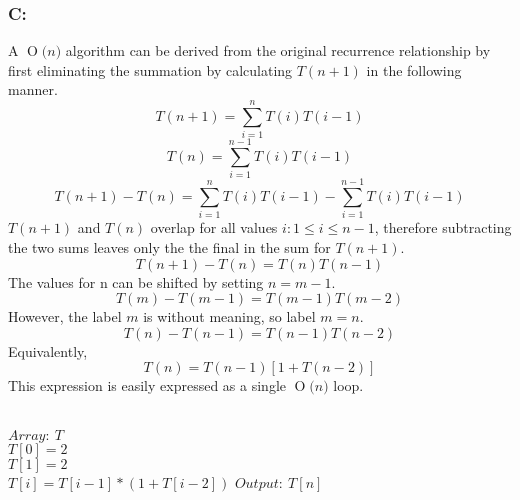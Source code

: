 \documentclass[12pt]{article}
\newcommand{\BigO}[1]{\ensuremath{\operatorname{O}\bigl(#1\bigr)}}
\begin{document}
\subsubsection*{C:}
A \BigO{n} algorithm can be derived from the original recurrence
relationship by first eliminating the summation by calculating
$T(n+1)$ in the following manner.
\[
T(n+1) = \sum_{i=1}^{n}T(i)T(i-1)
\]
\[
T(n) = \sum_{i=1}^{n-1}T(i)T(i-1)
\]
\[
T(n+1) - T(n) = \sum_{i=1}^{n}T(i)T(i-1) - \sum_{i=1}^{n-1}T(i)T(i-1)  
\]
$T(n+1)$ and $T(n)$ overlap for all values $i:1\leq i\leq n-1$, therefore
subtracting the two sums leaves only the the final in the sum for $T(n+1)$.
\[
T(n+1) - T(n) = T(n)T(n-1)
\] 
The values for n can be shifted by setting $n = m-1$.
\[
T(m) - T(m-1) = T(m-1)T(m-2)
\]
However, the label $m$ is without meaning, so label $m=n$.
\[
T(n) - T(n-1) = T(n-1)T(n-2)
\]
Equivalently,
\[
T(n) = T(n-1)[1+T(n-2)]
\]
This expression is easily expressed as a single \BigO{n} loop.\\\\
\begin{algorithm}[H]
$Array:\ T$\\
$T[0] = 2$\\
$T[1] = 2$\\
{$T[i] = T[i-1]*(1+T[i-2])$}
$Output:\ T[n]$
\end{algorithm}
\end{document}
